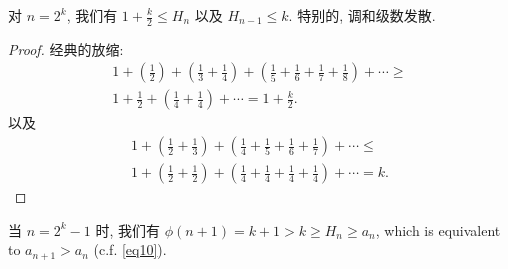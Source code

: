 \begin{soln}
\begin{lem}
对 $n=2^k$, 我们有 $1 + \frac{k}{2} \le H_n$ 以及 $H_{n-1} \le k$.
特别的, 调和级数发散.
\end{lem}

\begin{proof}
经典的放缩:
\begin{multline*}
1 + \left(\frac{1}{2}\right) +\left(\frac{1}{3} + \frac{1}{4}\right)
+ \left(\frac{1}{5} + \frac{1}{6} + \frac{1}{7} + \frac{1}{8}\right) + \cdots
\ge\\ 1 + \frac{1}{2} + \left(\frac{1}{4} + \frac{1}{4}\right) + \cdots = 1 + \frac{k}{2}.
\end{multline*}
以及
\begin{multline*}
1 + \left(\frac{1}{2} + \frac{1}{3}\right) +
\left(\frac{1}{4} + \frac{1}{5} + \frac{1}{6} + \frac{1}{7}\right) + \cdots
\le\\ 1 + \left(\frac{1}{2} + \frac{1}{2}\right) +
\left(\frac{1}{4} + \frac{1}{4} + \frac{1}{4} + \frac{1}{4}\right) + \cdots = k.
\end{multline*}
\end{proof}

当 $n=2^k-1$ 时, 我们有 $\phi(n+1) = k+1 > k \ge H_n \ge a_n$,
which is equivalent to $a_{n+1} > a_n$ (c.f. \cref{eq10}).
\end{soln}
